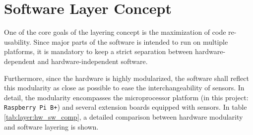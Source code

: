 \chapter{Software Layer Concept}
\label{sec:layer}

One of the core goals of the layering concept is the maximization of code re-usability. Since major parts of the software is intended to run on multiple platforms, it is mandatory to keep a strict separation between hardware-dependent and hardware-independent software. 

Furthermore, since the hardware is highly modularized, the software shall reflect this modularity as close as possible to ease the interchangeability of sensors. In detail, the modularity encompasses the microprocessor platform (in this project: \texttt{Raspberry Pi B+}) and several extension boards equipped with sensors. In table \ref{tab:layer:hw_sw_comp}, a detailed comparison between hardware modularity and software layering is shown.

